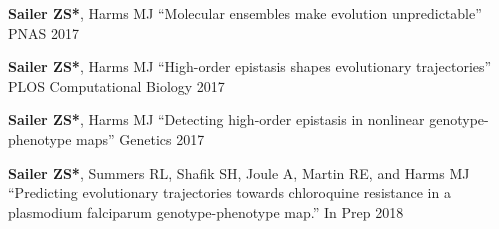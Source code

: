 

\begin{cvpublications}

  \cvpublication
    {\textbf{Sailer ZS*}, Harms MJ} %
    {``Molecular ensembles make evolution unpredictable''} %
    {PNAS} %
    {2017} %

  \cvpublication
    {\textbf{Sailer ZS*}, Harms MJ} %
    {``High-order epistasis shapes evolutionary trajectories''} %
    {PLOS Computational Biology} %
    {2017} %

  \cvpublication
    {\textbf{Sailer ZS*}, Harms MJ} %
    {``Detecting high-order epistasis in nonlinear genotype-phenotype maps''} %
    {Genetics} %
    {2017} %

  \cvpublication
    {\textbf{Sailer ZS*}, Summers RL, Shafik SH, Joule A, Martin RE, and Harms MJ} %
    {``Predicting evolutionary trajectories towards chloroquine resistance in a plasmodium falciparum genotype-phenotype map.''} %
    {In Prep} %
    {2018} %

\end{cvpublications}
